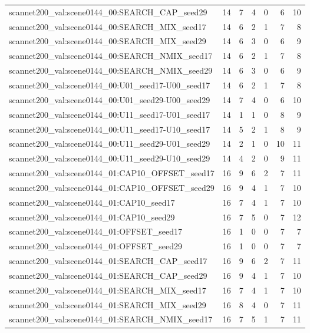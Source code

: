 \begin{table}[t]
\begin{tabular}{lrrrrrr}
scannet200\_val:scene0144\_00:SEARCH\_CAP\_seed29 & 14 & 7 & 4 & 0 & 6 & 10 \\
scannet200\_val:scene0144\_00:SEARCH\_MIX\_seed17 & 14 & 6 & 2 & 1 & 7 & 8 \\
scannet200\_val:scene0144\_00:SEARCH\_MIX\_seed29 & 14 & 6 & 3 & 0 & 6 & 9 \\
scannet200\_val:scene0144\_00:SEARCH\_NMIX\_seed17 & 14 & 6 & 2 & 1 & 7 & 8 \\
scannet200\_val:scene0144\_00:SEARCH\_NMIX\_seed29 & 14 & 6 & 3 & 0 & 6 & 9 \\
scannet200\_val:scene0144\_00:U01\_seed17-U00\_seed17 & 14 & 6 & 2 & 1 & 7 & 8 \\
scannet200\_val:scene0144\_00:U01\_seed29-U00\_seed29 & 14 & 7 & 4 & 0 & 6 & 10 \\
scannet200\_val:scene0144\_00:U11\_seed17-U01\_seed17 & 14 & 1 & 1 & 0 & 8 & 9 \\
scannet200\_val:scene0144\_00:U11\_seed17-U10\_seed17 & 14 & 5 & 2 & 1 & 8 & 9 \\
scannet200\_val:scene0144\_00:U11\_seed29-U01\_seed29 & 14 & 2 & 1 & 0 & 10 & 11 \\
scannet200\_val:scene0144\_00:U11\_seed29-U10\_seed29 & 14 & 4 & 2 & 0 & 9 & 11 \\
scannet200\_val:scene0144\_01:CAP10\_OFFSET\_seed17 & 16 & 9 & 6 & 2 & 7 & 11 \\
scannet200\_val:scene0144\_01:CAP10\_OFFSET\_seed29 & 16 & 9 & 4 & 1 & 7 & 10 \\
scannet200\_val:scene0144\_01:CAP10\_seed17 & 16 & 7 & 4 & 1 & 7 & 10 \\
scannet200\_val:scene0144\_01:CAP10\_seed29 & 16 & 7 & 5 & 0 & 7 & 12 \\
scannet200\_val:scene0144\_01:OFFSET\_seed17 & 16 & 1 & 0 & 0 & 7 & 7 \\
scannet200\_val:scene0144\_01:OFFSET\_seed29 & 16 & 1 & 0 & 0 & 7 & 7 \\
scannet200\_val:scene0144\_01:SEARCH\_CAP\_seed17 & 16 & 9 & 6 & 2 & 7 & 11 \\
scannet200\_val:scene0144\_01:SEARCH\_CAP\_seed29 & 16 & 9 & 4 & 1 & 7 & 10 \\
scannet200\_val:scene0144\_01:SEARCH\_MIX\_seed17 & 16 & 7 & 4 & 1 & 7 & 10 \\
scannet200\_val:scene0144\_01:SEARCH\_MIX\_seed29 & 16 & 8 & 4 & 0 & 7 & 11 \\
scannet200\_val:scene0144\_01:SEARCH\_NMIX\_seed17 & 16 & 7 & 5 & 1 & 7 & 11 \\

\end{tabular}
\end{table}
